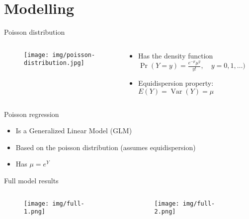 \documentclass{minesbeamer}
\begin{document}
\author[Davide Nieto]{Vasile Bezer, 2124011 \and Davide Nieto, 2126359}
\section{Modelling}

\begin{frame}{Poisson distribution}
    \begin{columns}
        \begin{column}{0.6\textwidth}
            \begin{figure}
                \centering
                \texttt{[image: img/poisson-distribution.jpg]}
            \end{figure}
        \end{column}
        \begin{column}{0.4\textwidth}
            \begin{itemize}
                \item Has the density function \(\Pr(Y = y) = \frac{e^{-\mu} \mu^y}{y!}, \quad y = 0, 1, \ldots)\)
                \item Equidispersion property: \(E(Y) = \operatorname{Var}(Y) = \mu\)
            \end{itemize}
        \end{column}
    \end{columns}
\end{frame}

\begin{frame}{Poisson regression}
    \begin{itemize}
        \item Is a Generalized Linear Model (GLM)
        \item Based on the poisson distribution (assumes equidispersion)
        \item Has \(\mu = e^Y\)
    \end{itemize}
\end{frame}

\begin{frame}{Full model results}
    \begin{columns}
        \begin{column}{0.5\textwidth}
            \begin{figure}
                \centering
                \texttt{[image: img/full-1.png]}
            \end{figure}
        \end{column}
        \begin{column}{0.5\textwidth}
            \begin{figure}
                \centering
                \texttt{[image: img/full-2.png]}
            \end{figure}
        \end{column}
    \end{columns}
\end{frame}
\end{document}
